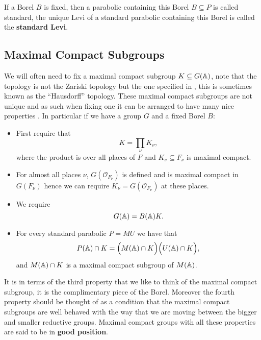     If a Borel \(B\) is fixed, then a parabolic containing this Borel \(B\subseteq P\) is called standard, the unique Levi of a standard parabolic containing this Borel is called the \textbf{standard Levi}.

    \subsection{Maximal Compact Subgroups}\label{max_compact_subgroup}
    We will often need to fix a maximal compact subgroup \(K\subseteq G(\A)\), note that the topology is not the Zariski topology but the one specified in \cite{conradWeilGrothendieckApproaches2012}, this is sometimes known as the ``Hausdorff'' topology. These maximal compact subgroups are not unique and as such when fixing one it can be arranged to have many nice properties \cite[I.1.4]{moeglinSpectralDecompositionEisenstein1995}. In particular if we have a group \(G\) and a fixed Borel \(B\):
    \begin{itemize}
        \item First require that 
        \[K = \prod_\nu K_\nu,\]
        where the product is over all places of \(F\) and \(K_\nu\subseteq F_\nu\) is maximal compact.
        \item For almost all places \(\nu\), \(G(\mathcal{O}_{F_\nu})\) is defined and is maximal compact in \(G(F_\nu)\) hence we can require \(K_\nu = G(\mathcal{O}_{F_\nu})\) at these places. 
        \item We require 
        \[G(\A) = B(\A)K.\]
        \item For every standard parabolic \(P = MU\) we have that 
        \[P(\A)\cap K = \Bigl( M(\A)\cap K \Bigr) \Bigl( U(\A)\cap K \Bigr),\]
        and \(M(\A)\cap K\) is a maximal compact subgroup of \(M(\A)\).
    \end{itemize}
     It is in terms of the third property that we like to think of the maximal compact subgroup, it is the complimentary piece of the Borel. Moreover the fourth property should be thought of as a condition that the maximal compact subgroups are well behaved with the way that we are moving between the bigger and smaller reductive groups.
    Maximal compact groups with all these properties are said to be in \textbf{good position}.
